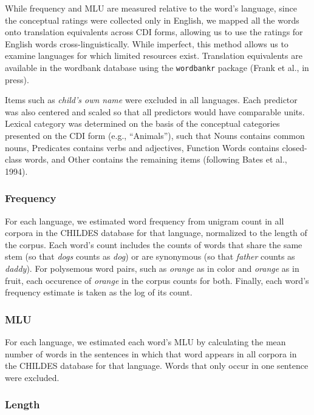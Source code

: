\documentclass[10pt, letterpaper]{article}
\begin{document}
While frequency and MLU are measured relative to the word's language,
since the conceptual ratings were collected only in English, we mapped
all the words onto translation equivalents across CDI forms, allowing us
to use the ratings for English words cross-linguistically. While
imperfect, this method allows us to examine languages for which limited
resources exist. Translation equivalents are available in the wordbank
database using the \texttt{wordbankr} package (Frank et al., in press).

Items such as \emph{child's own name} were excluded in all languages.
Each predictor was also centered and scaled so that all predictors would
have comparable units. Lexical category was determined on the basis of
the conceptual categories presented on the CDI form (e.g., ``Animals''),
such that Nouns contains common nouns, Predicates contains verbs and
adjectives, Function Words contains closed-class words, and Other
contains the remaining items (following Bates et al., 1994).

\subsubsection{Frequency}\label{frequency}

For each language, we estimated word frequency from unigram count in all
corpora in the CHILDES database for that language, normalized to the
length of the corpus. Each word's count includes the counts of words
that share the same stem (so that \emph{dogs} counts as \emph{dog}) or
are synonymous (so that \emph{father} counts as \emph{daddy}). For
polysemous word pairs, such as \emph{orange} as in color and
\emph{orange} as in fruit, each occurence of \emph{orange} in the corpus
counts for both. Finally, each word's frequency estimate is taken as the
log of its count.

\subsubsection{MLU}\label{mlu}

For each language, we estimated each word's MLU by calculating the mean
number of words in the sentences in which that word appears in all
corpora in the CHILDES database for that language. Words that only occur
in one sentence were excluded.

\subsubsection{Length}\label{length}
\end{document}
